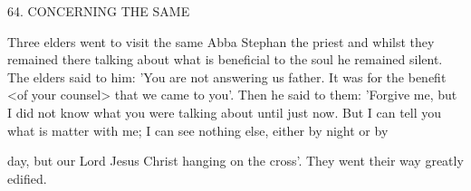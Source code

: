 64.
CONCERNING THE SAME

Three elders went to visit the same Abba Stephan the priest and
whilst they remained there talking about what is beneficial to the
soul he remained silent.
The elders said to him: 'You are not
answering us father.
It was for the benefit <of your counsel> that
we came to you'.
Then he said to them: 'Forgive me, but I did not
know what you were talking about until just now.
But I can tell you
what is matter with me; I can see nothing else, either by night or by

day, but our Lord Jesus Christ hanging on the cross'.
They went
their way greatly edified.

